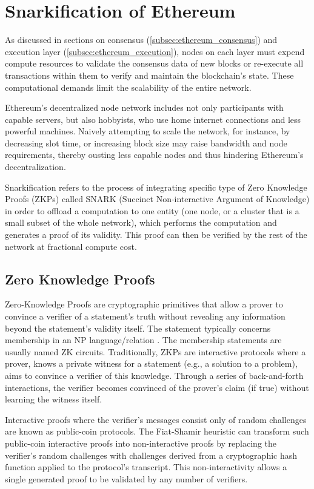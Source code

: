 \section{Snarkification of Ethereum}

As discussed in sections on consensus (\ref{subsec:ethereum_consensus}) and
execution layer (\ref{subsec:ethereum_execution}), nodes on each layer must expend
compute resources to validate the consensus data of new blocks or re-execute all
transactions within them to verify and maintain the blockchain's state.
These computational demands limit the scalability of the entire network.

Ethereum's decentralized node network includes not only participants with
capable servers, but also hobbyists, who use home internet connections and
less powerful machines. Naively attempting to scale the network, for instance,
by decreasing slot time, or increasing block size may raise bandwidth and node
requirements, thereby ousting less capable nodes and thus hindering Ethereum's
decentralization.

Snarkification refers to the process of integrating specific type of Zero
Knowledge Proofs (ZKPs) called SNARK (Succinct Non-interactive Argument of
Knowledge) in order to offload a computation to one entity (one node, or a
cluster that is a small subset of the whole network), which performs the
computation and generates a proof of its validity. This proof can then be
verified by the rest of the network at fractional compute cost.

\subsection{Zero Knowledge Proofs}

Zero-Knowledge Proofs are cryptographic primitives that allow a prover
to convince a verifier of a statement's truth without revealing any
information beyond the statement's validity itself. The statement typically
concerns membership in an NP language/relation \cite{GoldreichNPProofs}.
The membership statements are usually named ZK circuits.
Traditionally, ZKPs are interactive protocols where a prover, knows a
private witness for a statement (e.g., a solution to a problem), aims to
convince a verifier of this knowledge. Through a series of back-and-forth
interactions, the verifier becomes convinced of the prover's claim (if true)
without learning the witness itself.

Interactive proofs where the verifier's messages consist only of random
challenges are known as public-coin protocols. The Fiat-Shamir heuristic \cite{FiatShamir}
can transform such public-coin interactive proofs into non-interactive
proofs by replacing the verifier's random challenges with challenges derived
from a cryptographic hash function applied to the protocol's transcript. This
non-interactivity allows a single generated proof to be validated by any
number of verifiers.

